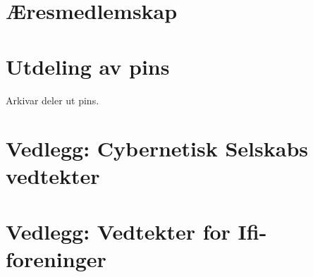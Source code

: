 \documentclass[10pt,norsk,a4paper]{article}
\begin{document}
\section{Æresmedlemskap}

\section{Utdeling av pins}

Arkivar deler ut pins.

\section*{Vedlegg: Cybernetisk Selskabs vedtekter}
\section*{Vedlegg: Vedtekter for Ifi-foreninger}\label{lastpage}


\newpage



\end{document}
